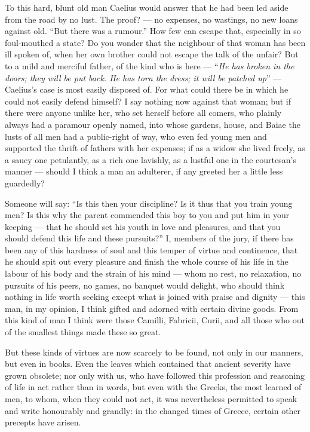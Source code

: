  To this hard, blunt old man Caelius would answer that he had been led aside from the road by no lust. The proof? --- no expenses, no wastings, no new loans against old. ``But there was a rumour.'' How few can escape that, especially in so foul-mouthed a state? Do you wonder that the neighbour of that woman has been ill spoken of, when her own brother could not escape the talk of the unfair? But to a mild and merciful father, of the kind who is here --- ``\textit{He has broken in the doors; they will be put back. He has torn the dress; it will be patched up}'' --- Caelius's case is most easily disposed of. For what could there be in which he could not easily defend himself? I say nothing now against that woman; but if there were anyone unlike her, who set herself before all comers, who plainly always had a paramour openly named, into whose gardens, house, and Baiae the lusts of all men had a public-right of way, who even fed young men and supported the thrift of fathers with her expenses; if as a widow she lived freely, as a saucy one petulantly, as a rich one lavishly, as a lustful one in the courtesan's manner --- should I think a man an adulterer, if any greeted her a little less guardedly?

 Someone will say: ``Is this then your discipline? Is it thus that you train young men? Is this why the parent commended this boy to you and put him in your keeping --- that he should set his youth in love and pleasures, and that you should defend this life and these pursuits?'' I, members of the jury, if there has been any of this hardness of soul and this temper of virtue and continence, that he should spit out every pleasure and finish the whole course of his life in the labour of his body and the strain of his mind --- whom no rest, no relaxation, no pursuits of his peers, no games, no banquet would delight, who should think nothing in life worth seeking except what is joined with praise and dignity --- this man, in my opinion, I think gifted and adorned with certain divine goods. From this kind of man I think were those Camilli, Fabricii, Curii, and all those who out of the smallest things made these so great.

 But these kinds of virtues are now scarcely to be found, not only in our manners, but even in books. Even the leaves which contained that ancient severity have grown obsolete; nor only with us, who have followed this profession and reasoning of life in act rather than in words, but even with the Greeks, the most learned of men, to whom, when they could not act, it was nevertheless permitted to speak and write honourably and grandly: in the changed times of Greece, certain other precepts have arisen.

